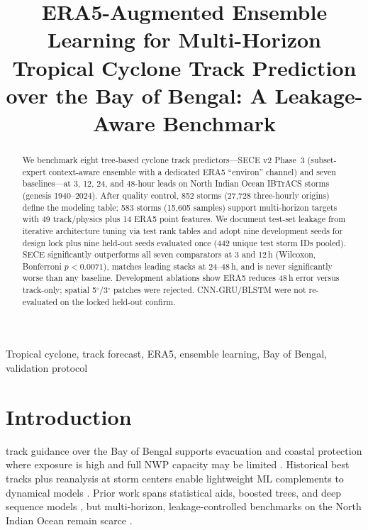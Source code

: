 \documentclass[conference]{IEEEtran}
\newcommand{\sece}{SECE}
\newcommand{\bob}{Bay of Bengal}
\newcommand{\era}{ERA5}
\newcommand{\ibtracs}{IBTrACS}
\newcommand{\bonf}{0.0071}
\begin{document}
\title{ERA5-Augmented Ensemble Learning for Multi-Horizon Tropical Cyclone Track Prediction over the Bay of Bengal: A Leakage-Aware Benchmark}

\author{%
}

\maketitle

\begin{abstract}
We benchmark eight tree-based cyclone track predictors---\sece{} v2 Phase~3 (subset-expert context-aware ensemble with a dedicated \era{} ``environ'' channel) and seven baselines---at 3, 12, 24, and 48-hour leads on North Indian Ocean \ibtracs{} storms (genesis 1940--2024).
After quality control, 852 storms (27{,}728 three-hourly origins) define the modeling table; 583 storms (15{,}605 samples) support multi-horizon targets with 49 track/physics plus 14 \era{} point features.
We document test-set leakage from iterative architecture tuning via test rank tables and adopt nine development seeds for design lock plus nine held-out seeds evaluated once (442 unique test storm IDs pooled).
\sece{} significantly outperforms all seven comparators at 3 and 12\,h (Wilcoxon, Bonferroni $p<\bonf$), matches leading stacks at 24--48\,h, and is never significantly worse than any baseline.
Development ablations show \era{} reduces 48\,h error versus track-only; spatial 5$^\circ$/3$^\circ$ patches were rejected.
CNN-GRU/BLSTM were not re-evaluated on the locked held-out confirm.
\end{abstract}

\begin{IEEEkeywords}
Tropical cyclone, track forecast, ERA5, ensemble learning, Bay of Bengal, validation protocol
\end{IEEEkeywords}

\section{Introduction}
 track guidance over the \bob{} supports evacuation and coastal protection where exposure is high and full NWP capacity may be limited \cite{paul2010,mohapatra2015}.
Historical best tracks plus reanalysis at storm centers enable lightweight ML complements to dynamical models \cite{knapp2010,hersbach2020,demaria2013}.
Prior work spans statistical aids, boosted trees, and deep sequence models \cite{neumann1972,liu2020,chen2020,grinsztajn2022}, but multi-horizon, leakage-controlled benchmarks on the North Indian Ocean remain scarce \cite{chan2005,prat2021}.
\end{document}
